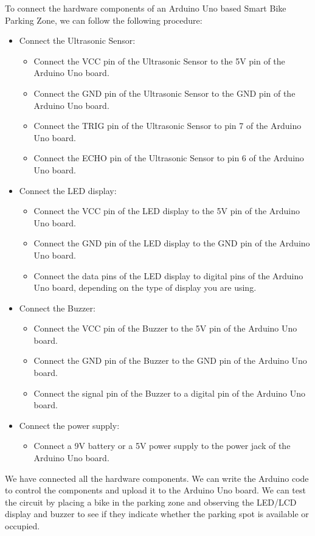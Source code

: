 \documentclass[conference]{IEEEtran}
\begin{document}
	To connect the hardware components of an Arduino Uno based Smart Bike Parking Zone, we can follow the following procedure:
	\begin{itemize}
		\item Connect the Ultrasonic Sensor:
	\begin{itemize}
	
		\item Connect the VCC pin of the Ultrasonic Sensor to the 5V pin of the Arduino Uno board.
		\item Connect the GND pin of the Ultrasonic Sensor to the GND pin of the Arduino Uno board.
		\item Connect the TRIG pin of the Ultrasonic Sensor to pin 7 of the Arduino Uno board.
		\item Connect the ECHO pin of the Ultrasonic Sensor to pin 6 of the Arduino Uno board.
	\end{itemize}
		\item Connect the LED display:
\begin{itemize}
	
	\item Connect the VCC pin of the LED display to the 5V pin of the Arduino Uno board.
	\item Connect the GND pin of the LED display to the GND pin of the Arduino Uno board.
	\item Connect the data pins of the LED display to digital pins of the Arduino Uno board, depending on the type of display you are using.

\end{itemize}
	\item Connect the Buzzer:
\begin{itemize}
	
	\item Connect the VCC pin of the Buzzer to the 5V pin of the Arduino Uno board.
	\item Connect the GND pin of the Buzzer to the GND pin of the Arduino Uno board.
	\item Connect the signal pin of the Buzzer to a digital pin of the Arduino Uno board.	
\end{itemize}
	\item Connect the power supply:
\begin{itemize}	
	\item Connect a 9V battery or a 5V power supply to the power jack of the Arduino Uno board.	
\end{itemize}
\end{itemize}
We have connected all the hardware components. We can write the Arduino code to control the components and upload it to the Arduino Uno board. We can test the circuit by placing a bike in the parking zone and observing the LED/LCD display and buzzer to see if they indicate whether the parking spot is available or occupied.	
\end{document}
